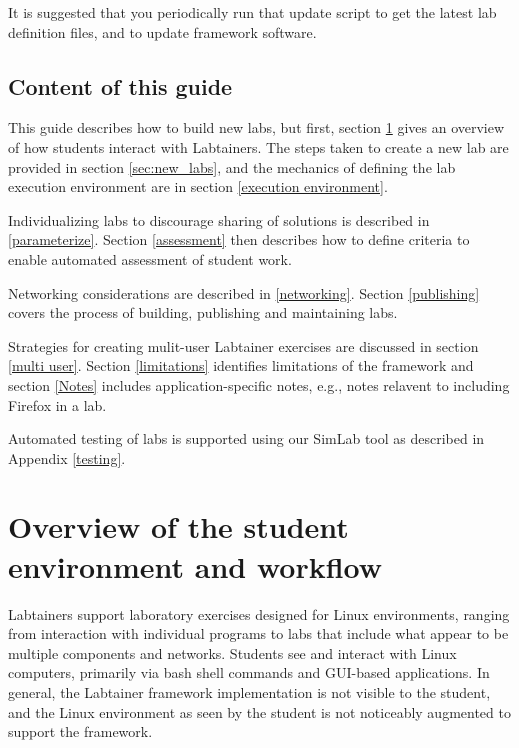 \documentclass[12pt]{article}
\begin{document}
It is suggested that you periodically run that update script to get the latest lab definition files,
and to update framework software.   

\subsection{Content of this guide}
This guide describes how to build new labs, but first, section \ref{student environment}
gives an overview of how students interact with Labtainers.  The steps taken to
create a new lab are provided in section \ref{sec:new_labs}, and the mechanics of defining
the lab execution environment are in section \ref{execution environment}.

Individualizing labs to discourage sharing of solutions is described in \ref{parameterize}.
Section \ref{assessment} then describes how to define criteria to enable automated assessment
of student work.  

Networking considerations are described in \ref{networking}.  Section \ref{publishing} covers
the process of building, publishing and maintaining labs.

Strategies for creating mulit-user Labtainer exercises are discussed in section \ref{multi user}.
Section \ref{limitations} identifies limitations of the framework and section \ref{Notes} includes
application-specific notes, e.g., notes relavent to including Firefox in a lab.

Automated testing of labs is supported using our SimLab tool as described in Appendix \ref{testing}.


\section {Overview of the student environment and workflow}
\label{student environment}
Labtainers support laboratory exercises designed for Linux environments,
ranging from interaction with individual programs to labs that include
what appear to be multiple components and networks.  Students see and interact with Linux
computers, primarily via bash shell commands and GUI-based applications. In general, the Labtainer
framework implementation is not visible to the student, and the Linux
environment as seen by the student is not noticeably augmented to support the framework.
\end{document}
